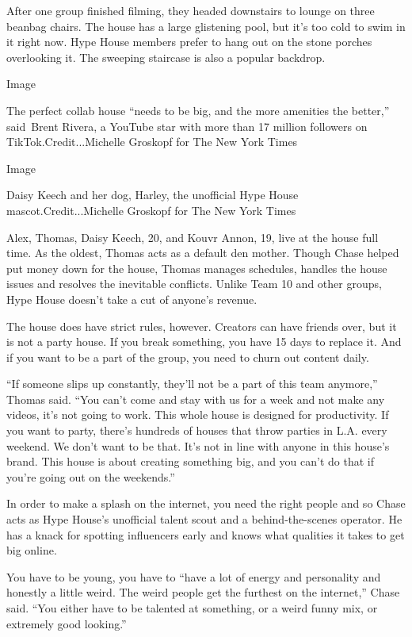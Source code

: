 After one group finished filming, they headed downstairs to lounge on
three beanbag chairs. The house has a large glistening pool, but it's
too cold to swim in it right now. Hype House members prefer to hang out
on the stone porches overlooking it. The sweeping staircase is also a
popular backdrop.

Image

The perfect collab house ``needs to be big, and the more amenities the
better,'' said~Brent Rivera, a YouTube star with more than 17 million
followers on TikTok.Credit...Michelle Groskopf for The New York Times

Image

Daisy Keech and her dog, Harley, the unofficial Hype House
mascot.Credit...Michelle Groskopf for The New York Times

Alex, Thomas, Daisy Keech, 20, and Kouvr Annon, 19, live at the house
full time. As the oldest, Thomas acts as a default den mother. Though
Chase helped put money down for the house, Thomas manages schedules,
handles the house issues and resolves the inevitable conflicts. Unlike
Team 10 and other groups, Hype House doesn't take a cut of anyone's
revenue.

The house does have strict rules, however. Creators can have friends
over, but it is not a party house. If you break something, you have 15
days to replace it. And if you want to be a part of the group, you need
to churn out content daily.

``If someone slips up constantly, they'll not be a part of this team
anymore,'' Thomas said. ``You can't come and stay with us for a week and
not make any videos, it's not going to work. This whole house is
designed for productivity. If you want to party, there's hundreds of
houses that throw parties in L.A. every weekend. We don't want to be
that. It's not in line with anyone in this house's brand. This house is
about creating something big, and you can't do that if you're going out
on the weekends.''

In order to make a splash on the internet, you need the right people and
so Chase acts as Hype House's unofficial talent scout and a
behind-the-scenes operator. He has a knack for spotting influencers
early and knows what qualities it takes to get big online.

You have to be young, you have to ``have a lot of energy and personality
and honestly a little weird. The weird people get the furthest on the
internet,'' Chase said. ``You either have to be talented at something,
or a weird funny mix, or extremely good looking.''

